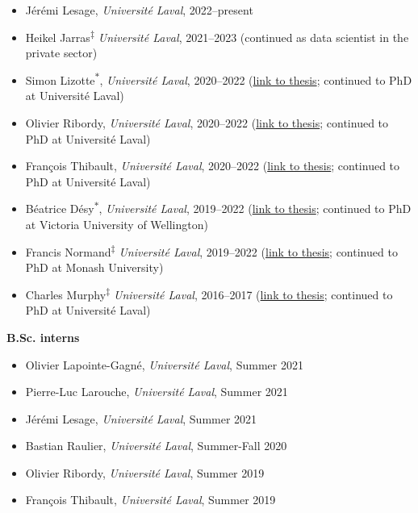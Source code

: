 \documentclass[11pt]{article}
\begin{document}
\begin{itemize}
  \item Jérémi Lesage, \textit{Universit\'e Laval}, 2022--present
  \item Heikel Jarras\textsuperscript{$\ddagger$} \textit{Universit\'e Laval}, 2021--2023 {\small (continued as data scientist in the private sector)}
  \item Simon Lizotte\textsuperscript{$\ast$}, \textit{Universit\'e Laval}, 2020--2022 {\small(\href{http://antoineallard.github.io/files/theses/Lizotte.2022.MSc.pdf}{link to thesis}; continued to PhD at Université Laval)}
  \item Olivier Ribordy, \textit{Universit\'e Laval}, 2020--2022 {\small(\href{http://antoineallard.github.io/files/theses/Ribordy.2022.MSc.pdf}{link to thesis}; continued to PhD at Université Laval)}
  \item Fran\c{c}ois Thibault, \textit{Universit\'e Laval}, 2020--2022 {\small(\href{http://antoineallard.github.io/files/theses/Thibault.2022.MSc.pdf}{link to thesis}; continued to PhD at Université Laval)}
  \item B\'eatrice D\'esy\textsuperscript{$\ast$}, \textit{Universit\'e Laval}, 2019--2022 {\small(\href{http://antoineallard.github.io/files/theses/Desy.2022.MSc.pdf}{link to thesis}; continued to PhD at Victoria University of Wellington)}
  \item Francis Normand\textsuperscript{$\ddagger$} \textit{Universit\'e Laval}, 2019--2022 {\small(\href{http://hdl.handle.net/20.500.11794/73573}{link to thesis}; continued to PhD at Monash University)}
  \item Charles Murphy\textsuperscript{$\ddagger$} \textit{Universit\'e Laval}, 2016--2017 {\small(\href{http://hdl.handle.net/20.500.11794/30382}{link to thesis}; continued to PhD at Université Laval)}
\end{itemize}
%
%
%
\textbf{B.Sc. interns}
%
\begin{itemize}
  \item Olivier Lapointe-Gagn\'e, \textit{Universit\'e Laval}, Summer 2021
  \item Pierre-Luc Larouche, \textit{Universit\'e Laval}, Summer 2021
  \item Jérémi Lesage, \textit{Universit\'e Laval}, Summer 2021
  \item Bastian Raulier, \textit{Universit\'e Laval}, Summer-Fall 2020
  \item Olivier Ribordy, \textit{Universit\'e Laval}, Summer 2019
  \item Fran\c{c}ois Thibault, \textit{Universit\'e Laval}, Summer 2019
\end{itemize}
\end{document}
